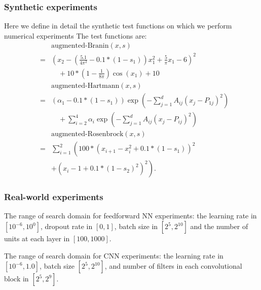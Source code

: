 \documentclass[letterpaper]{article}
\numberwithin{equation}{section}
\begin{document}
\subsubsection{Synthetic experiments}
Here we define in detail the synthetic test functions on which we perform numerical experiments
The test functions are: 
\begin{eqnarray*}
&&\text{augmented-Branin}(x, s) \\
&=& \left(x_2 - \left(\frac{5.1}{4 \pi^2} - 0.1*(1-s_1)\right) x_1^2 + \frac{5}{\pi} x_1 - 6\right)^2 \\
&& \quad + 10*\left(1-\frac{1}{8\pi}\right)\cos(x_1) + 10\\
&&\text{augmented-Hartmann}(x, s) \\
&=& \left(\alpha_1-0.1*(1-s_1)\right) \exp{\left(-\sum_{j=1}^d A_{ij} (x_j - P_{1j})^2\right)}\\
&&\quad + \sum_{i=2}^{4} \alpha_i \exp{\left(-\sum_{j=1}^d A_{ij} (x_j - P_{ij})^2\right)}\\
&&\text{augmented-Rosenbrock}(x, s) \\
& = & \sum_{i=1}^2 \left(100*(x_{i+1}-x_i^2 + 0.1*(1-s_1))^2\right.\\
& & + \left.\left(x_i-1+0.1*(1-s_2)^2\right)^2\right).
\end{eqnarray*} 

\subsubsection{Real-world experiments}
The range of search domain for feedforward NN experiments: the learning rate in $[10^{-6}, 10^0]$, dropout rate in $[0, 1]$, batch size in $[2^5, 2^{10}]$ and the number of units at each layer in $[100, 1000]$.

The range of search domain for CNN experiments: the learning rate in $[10^{-6}, 1.0]$, batch size $[2^5, 2^{10}]$, and number of filters in each convolutional block in $[2^5, 2^9]$. 




\end{document}
